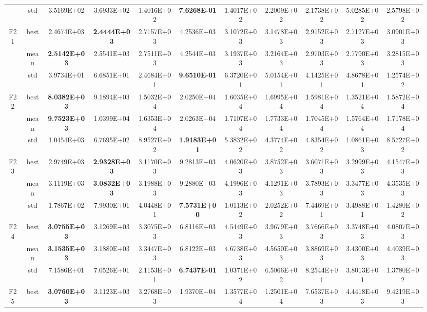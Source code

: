 \documentclass{wzuthesis}
\begin{document}
\begin{longtable}{ccccccccccc}
          & std   & 3.5169E+02 & 3.6933E+02 & 1.4016E+02 & \textbf{7.6268E-01} & 1.4017E+02 & 2.2009E+02 & 2.1738E+02 & 5.0285E+02 & 2.5798E+02 \\
\multirow{3}[0]{*}{F21} & best  & 2.4674E+03 & \textbf{2.4444E+03} & 2.7157E+03 & 4.2536E+03 & 3.1072E+03 & 3.1478E+03 & 2.9152E+03 & 2.7127E+03 & 3.0901E+03 \\
          & mean  & \textbf{2.5142E+03} & 2.5541E+03 & 2.7511E+03 & 4.2544E+03 & 3.1937E+03 & 3.2164E+03 & 2.9703E+03 & 2.7790E+03 & 3.2815E+03 \\
          & std   & 3.9734E+01 & 6.6851E+01 & 2.4684E+01 & \textbf{9.6510E-01} & 6.3720E+01 & 5.0154E+01 & 4.1425E+01 & 4.8678E+01 & 1.2574E+02 \\
\multirow{3}[0]{*}{F22} & best  & \textbf{8.0382E+03} & 9.1894E+03 & 1.5032E+04 & 2.0250E+04 & 1.6035E+04 & 1.6995E+04 & 1.5981E+04 & 1.3521E+04 & 1.5872E+04 \\
          & mean  & \textbf{9.7523E+03} & 1.0399E+04 & 1.6353E+04 & 2.0263E+04 & 1.7107E+04 & 1.7733E+04 & 1.7045E+04 & 1.5764E+04 & 1.7178E+04 \\
          & std   & 1.0454E+03 & 6.7695E+02 & 8.9527E+02 & \textbf{1.9183E+01} & 5.3832E+02 & 4.3774E+02 & 4.8354E+02 & 1.0861E+03 & 8.5727E+02 \\
\multirow{3}[0]{*}{F23} & best  & 2.9749E+03 & \textbf{2.9328E+03} & 3.1170E+03 & 9.2813E+03 & 4.0620E+03 & 3.8752E+03 & 3.6071E+03 & 3.2999E+03 & 4.1547E+03 \\
          & mean  & 3.1119E+03 & \textbf{3.0832E+03} & 3.1988E+03 & 9.2880E+03 & 4.1996E+03 & 4.1291E+03 & 3.7893E+03 & 3.3477E+03 & 4.3535E+03 \\
          & std   & 1.7867E+02 & 7.9930E+01 & 4.0448E+01 & \textbf{7.5731E+00} & 1.0113E+02 & 2.0252E+02 & 7.4469E+01 & 3.4988E+01 & 1.4280E+02 \\
\multirow{3}[0]{*}{F24} & best  & \textbf{3.0755E+03} & 3.1269E+03 & 3.3075E+03 & 6.8116E+03 & 4.5449E+03 & 3.9679E+03 & 3.7666E+03 & 3.3748E+03 & 4.0807E+03 \\
          & mean  & \textbf{3.1535E+03} & 3.1880E+03 & 3.3447E+03 & 6.8122E+03 & 4.6738E+03 & 4.5650E+03 & 3.8869E+03 & 3.4300E+03 & 4.4039E+03 \\
          & std   & 7.1586E+01 & 7.0526E+01 & 2.1153E+01 & \textbf{6.7437E-01} & 1.0371E+02 & 6.5066E+02 & 8.2544E+01 & 3.8013E+01 & 1.3780E+02 \\
\multirow{3}[0]{*}{F25} & best  & \textbf{3.0760E+03} & 3.1123E+03 & 3.2768E+03 & 1.9370E+04 & 1.3577E+04 & 1.2501E+04 & 7.6537E+03 & 4.4418E+03 & 9.4219E+03 \\

\end{longtable}
\end{document}
